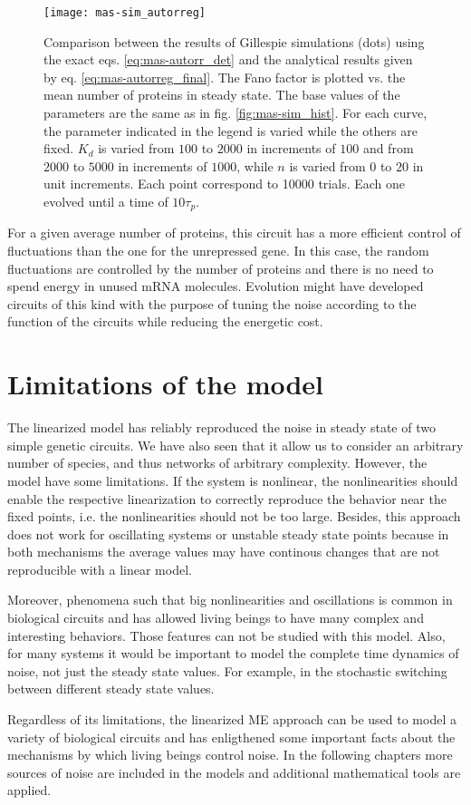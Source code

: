 \begin{figure}[H]
  \centering
  \texttt{[image: mas-sim\_autorreg]}
  \caption[Fano factor of the number of proteins for a negatively autorregulated gene]{\label{fig:mas-sim_autorreg} Comparison between the results of Gillespie simulations (dots) using the exact eqs. \eqref{eq:mas-autorr_det} and the analytical results given by eq. \eqref{eq:mas-autorreg_final}. The Fano factor is plotted vs. the mean number of proteins in steady state. The base values of the parameters are the same as in fig. \ref{fig:mas-sim_hist}. For each curve, the parameter indicated in the legend is varied while the others are fixed. $K_d$ is varied from $100$ to $2000$ in increments of $100$ and from $2000$ to $5000$ in increments of $1000$, while $n$ is varied from $0$ to $20$ in unit increments. Each point correspond to 10000 trials. Each one evolved until a time of $10\tau_p$.}
\end{figure}

For a given average number of proteins, this circuit has a more efficient control of fluctuations than the one for the unrepressed gene. In this case, the random fluctuations are controlled by the number of proteins and there is no need to spend energy in unused mRNA molecules. Evolution might have developed circuits of this kind with the purpose of tuning the noise according to the function of the circuits while reducing the energetic cost.

\section{Limitations of the model}

The linearized model has reliably reproduced the noise in steady state of two simple genetic circuits. We have also seen that it allow us to consider an arbitrary number of species, and thus networks of arbitrary complexity. However, the model have some limitations. If the system is nonlinear, the nonlinearities should enable the respective linearization to correctly reproduce the behavior near the fixed points, i.e. the nonlinearities should not be too large. Besides, this approach does not work for oscillating systems or unstable steady state points because in both mechanisms the average values may have continous changes that are not reproducible with a linear model.

Moreover, phenomena such that big nonlinearities and oscillations is common in biological circuits and has allowed living beings to have many complex and interesting behaviors. Those features can not be studied with this model. Also, for many systems it would be important to model the complete time dynamics of noise, not just the steady state values. For example, in the stochastic switching between different steady state values.

Regardless of its limitations, the linearized ME approach can be used to model a variety of biological circuits and has enligthened some important facts about the mechanisms by which living beings control noise. In the following chapters more sources of noise are included in the models and additional mathematical tools are applied.
